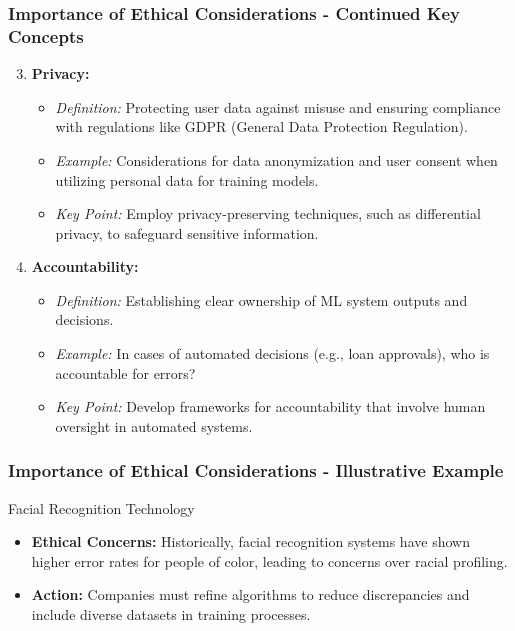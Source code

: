\documentclass[aspectratio=169]{beamer}
\begin{document}
\begin{frame}[fragile]
    \frametitle{Importance of Ethical Considerations - Continued Key Concepts}
    \begin{enumerate}
        \setcounter{enumi}{2} %
        \item \textbf{Privacy:}
            \begin{itemize}
                \item \textit{Definition:} Protecting user data against misuse and ensuring compliance with regulations like GDPR (General Data Protection Regulation).
                \item \textit{Example:} Considerations for data anonymization and user consent when utilizing personal data for training models.
                \item \textit{Key Point:} Employ privacy-preserving techniques, such as differential privacy, to safeguard sensitive information.
            \end{itemize}
        
        \item \textbf{Accountability:}
            \begin{itemize}
                \item \textit{Definition:} Establishing clear ownership of ML system outputs and decisions.
                \item \textit{Example:} In cases of automated decisions (e.g., loan approvals), who is accountable for errors?
                \item \textit{Key Point:} Develop frameworks for accountability that involve human oversight in automated systems.
            \end{itemize}
    \end{enumerate}
\end{frame}

\begin{frame}[fragile]
    \frametitle{Importance of Ethical Considerations - Illustrative Example}
    \begin{block}{Facial Recognition Technology}
        \begin{itemize}
            \item \textbf{Ethical Concerns:} Historically, facial recognition systems have shown higher error rates for people of color, leading to concerns over racial profiling.
            \item \textbf{Action:} Companies must refine algorithms to reduce discrepancies and include diverse datasets in training processes.
        \end{itemize}
    \end{block}
\end{frame}
\end{document}
